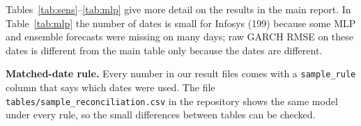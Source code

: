 \documentclass{article}
\begin{document}
Tables~\ref{tab:sens}--\ref{tab:mlp} give more detail on the results in the main report. In Table~\ref{tab:mlp} the number of dates is small for Infosys (199) because some MLP and ensemble forecasts were missing on many days; raw GARCH RMSE on these dates is different from the main table only because the dates are different.

\textbf{Matched-date rule.} Every number in our result files comes with a \texttt{sample\_rule} column that says which dates were used. The file \texttt{tables/sample\_reconciliation.csv} in the repository shows the same model under every rule, so the small differences between tables can be checked.
\end{document}

